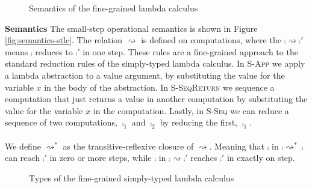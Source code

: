 {%

\begin{figure}
\caption{Semantics of the fine-grained lambda calculus}
\centering
{}
\end{figure}

\textbf{Semantics}
The small-step operational semantics is shown in Figure \ref{fig:semantics-stlc}.
The relation $\rightsquigarrow$ is defined on computations, where the $\comp \rightsquigarrow \comp'$ means $\comp$ reduces to $\comp'$ in one step.
These rules are a fine-grained approach to the standard reduction rules of the simply-typed lambda calculus.
In {\footnotesize\textsc{S-App}} we apply a lambda abstraction to a value argument, by substituting the value for the variable $x$ in the body of the abstraction.
In {\footnotesize\textsc{S-SeqReturn}} we sequence a computation that just returns a value in another computation by substituting the value for the variable $x$ in the computation.
Lastly, in {\footnotesize\textsc{S-Seq}} we can reduce a sequence of two computations, $\comp_1$ and $\comp_2$ by reducing the first, $\comp_1$.
\\\\
We define $\rightsquigarrow^*$ as the transitive-reflexive closure of $\rightsquigarrow$.
Meaning that $\comp$ in $\comp \rightsquigarrow^* \comp$ can reach $\comp'$ in zero or more steps, while $\comp$ in $\comp \rightsquigarrow \comp'$ reaches $\comp'$ in exactly on step.


\begin{figure}
\caption{Types of the fine-grained simply-typed lambda calculus}
\centering
\fbox{
\begin{minipage}{4 cm}
\begin{align*}
& \ty \Coloneqq \tunit \;|\; \tarr{\ty}{\cty} \\
& \cty \Coloneqq \ty \\
\end{align*}
\label{fig:types-stlc}
\end{minipage}
}
\end{figure}

}
